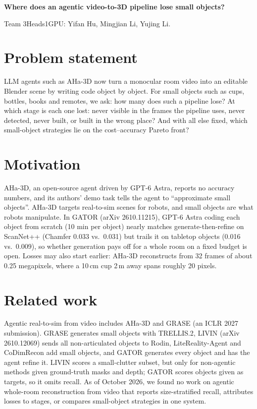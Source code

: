 \documentclass[11pt]{article}
\begin{document}
\begin{center}
{\large\bfseries Where does an agentic video-to-3D pipeline lose small objects?}\par\vspace{3pt}
{\small Team 3Heads1GPU: Yifan Hu, Mingjian Li, Yujing Li.}
\end{center}
\vspace{-10pt}

\section*{Problem statement}
LLM agents such as AHa-3D now turn a monocular room video into an editable Blender scene by writing code object by object. For small objects such as cups, bottles, books and remotes, we ask: how many does such a pipeline lose? At which stage is each one lost: never visible in the frames the pipeline uses, never detected, never built, or built in the wrong place? And with all else fixed, which small-object strategies lie on the cost--accuracy Pareto front?

\section*{Motivation}
AHa-3D, an open-source agent driven by GPT-6 Astra, reports no accuracy numbers, and its authors' demo task tells the agent to ``approximate small objects''. AHa-3D targets real-to-sim scenes for robots, and small objects are what robots manipulate. In GATOR (arXiv 2610.11215), GPT-6 Astra coding each object from scratch (10 min per object) nearly matches generate-then-refine on ScanNet++ (Chamfer 0.033 vs.\ 0.031) but trails it on tabletop objects (0.016 vs.\ 0.009), so whether generation pays off for a whole room on a fixed budget is open. Losses may also start earlier: AHa-3D reconstructs from 32 frames of about 0.25 megapixels, where a 10\,cm cup 2\,m away spans roughly 20 pixels.

\section*{Related work}
Agentic real-to-sim from video includes AHa-3D and GRASE (an ICLR 2027 submission). GRASE generates small objects with TRELLIS.2, LIVIN (arXiv 2610.12069) sends all non-articulated objects to Rodin, LiteReality-Agent and CoDimRecon add small objects, and GATOR generates every object and has the agent refine it. LIVIN scores a small-clutter subset, but only for non-agentic methods given ground-truth masks and depth; GATOR scores objects given as targets, so it omits recall. As of October 2026, we found no work on agentic whole-room reconstruction from video that reports size-stratified recall, attributes losses to stages, or compares small-object strategies in one system.
\end{document}
